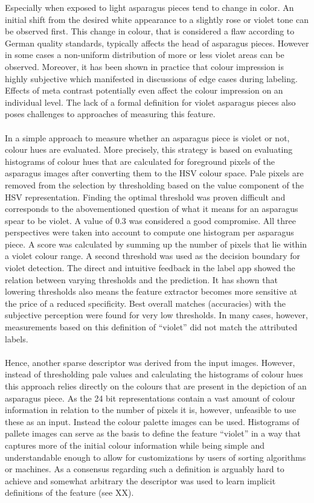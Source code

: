 Especially when exposed to light asparagus pieces tend to change in color. An initial shift from the desired white appearance to a slightly rose or violet tone can be observed first. This change in colour, that is considered a flaw according to German quality standards, typically affects the head of asparagus pieces. However in some cases a non-uniform distribution of more or less violet areas can be observed. Moreover, it has been shown in practice that colour impression is highly subjective which manifested in discussions of edge cases during labeling. Effects of meta contrast potentially even affect the colour impression on an individual level. The lack of a formal definition for violet asparagus pieces also poses challenges to approaches of measuring this feature. \\
\\
In a simple approach to measure whether an asparagus piece is violet or not, colour hues are evaluated. More precisely, this strategy is based on evaluating histograms of colour hues that are calculated for foreground pixels of the asparagus images after converting them to the HSV colour space. Pale pixels are removed from the selection by thresholding based on the value component of the HSV representation. Finding the optimal threshold was proven difficult and corresponds to the abovementioned question of what it means for an asparagus spear to be violet. A value of 0.3 was considered a good compromise. All three perspectives were taken into account to compute one histogram per asparagus piece. A score was calculated by summing up the number of pixels that lie within a violet colour range. A second threshold was used as the decision boundary for violet detection. The direct and intuitive feedback in the label app showed the relation between varying thresholds and the prediction. It has shown that lowering thresholds also means the feature extractor becomes more sensitive at the price of a reduced specificity. Best overall matches (accuracies) with the subjective perception were found for very low thresholds. In many cases, however, measurements based on this definition of “violet” did not match the attributed labels. \\
\\
Hence, another sparse descriptor was derived from the input images. However, instead of thresholding pale values and calculating the histograms of colour hues this approach relies directly on the colours that are present in the depiction of an asparagus piece. As the 24 bit representations contain a vast amount of colour information in relation to the number of pixels it is, however, unfeasible to use these as an input. Instead the colour palette images can be used. Histograms of pallete images can serve as the basis to define the feature “violet” in a way that captures more of the initial colour information while being simple and understandable enough to allow for customizations by users of sorting algorithms or machines. As a consensus regarding such a definition is arguably hard to achieve and somewhat arbitrary the descriptor was used to learn implicit definitions of the feature (see XX). \\
